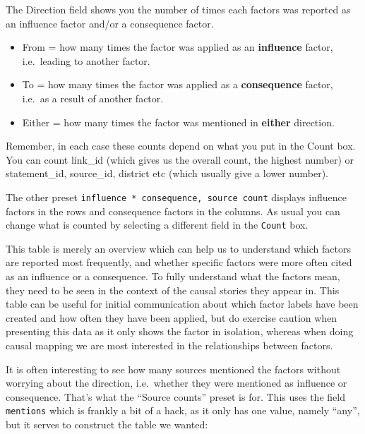 \documentclass[
]{book}
\providecommand{\tightlist}{%
  \setlength{\itemsep}{0pt}\setlength{\parskip}{0pt}}
\begin{document}
The Direction field shows you the number of times each factors was reported as an influence factor and/or a consequence factor.

\begin{itemize}
\tightlist
\item
  From = how many times the factor was applied as an \textbf{influence} factor, i.e.~leading to another factor.
\item
  To = how many times the factor was applied as a \textbf{consequence} factor, i.e.~as a result of another factor.
\item
  Either = how many times the factor was mentioned in \textbf{either} direction.
\end{itemize}

Remember, in each case these counts depend on what you put in the Count box. You can count link\_id (which gives us the overall count, the highest number) or statement\_id, source\_id, district etc (which usually give a lower number).

The other preset \texttt{influence\ *\ consequence,\ source\ count} displays influence factors in the rows and consequence factors in the columns. As usual you can change what is counted by selecting a different field in the \texttt{Count} box.

This table is merely an overview which can help us to understand which factors are reported most frequently, and whether specific factors were more often cited as an influence or a consequence. To fully understand what the factors mean, they need to be seen in the context of the causal stories they appear in. This table can be useful for initial communication about which factor labels have been created and how often they have been applied, but do exercise caution when presenting this data as it only shows the factor in isolation, whereas when doing causal mapping we are most interested in the relationships between factors.

It is often interesting to see how many sources mentioned the factors without worrying about the direction, i.e.~whether they were mentioned as influence or consequence. That's what the ``Source counts'' preset is for. This uses the field \texttt{mentions} which is frankly a bit of a hack, as it only has one value, namely ``any'', but it serves to construct the table we wanted:
\end{document}
